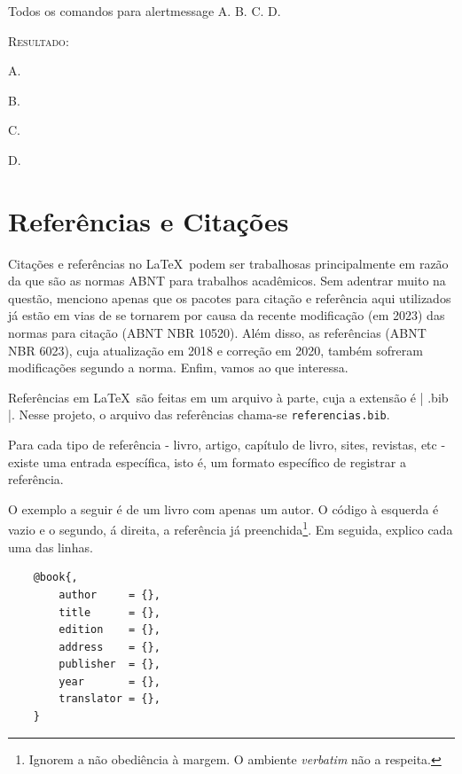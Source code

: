 \documentclass[a4paper,12pt,oneside,openright,extrafontsizes,openbib]{memoir}
\begin{document}
{\begin{codex}{Todos os comandos para alertmessage}
	A. 
	B. 
	C. 
	D. 
\end{codex}

\textsc{Resultado:}

A. 

B. 

C. 

D. 


\chapter{Referências e Citações}

Citações e referências no \LaTeX\ podem ser trabalhosas principalmente em razão da  que são as normas ABNT para trabalhos acadêmicos. Sem adentrar muito na questão, menciono apenas que os pacotes para citação e referência aqui utilizados já estão em vias de se tornarem  por causa da recente modificação (em 2023) das normas para citação (ABNT NBR 10520). Além disso, as referências (ABNT NBR 6023), cuja atualização em 2018 e correção em 2020, também sofreram modificações segundo a norma. Enfim, vamos ao que interessa.

Referências em \LaTeX\ são feitas em um arquivo à parte, cuja a extensão é | .bib |. Nesse projeto, o arquivo das referências chama-se \verb|referencias.bib|.

Para cada tipo de referência - livro, artigo, capítulo de livro, sites, revistas, etc - existe uma entrada específica, isto é, um formato específico de registrar a referência.

O exemplo a seguir é de um livro com apenas um autor. O código à esquerda é vazio e o segundo, á direita, a referência já preenchida\footnote{Ignorem a não obediência à margem. O ambiente \textit{verbatim} não a respeita.}. Em seguida, explico cada uma das linhas.

\begin{multicols}{2}
\begin{verbatim}
	@book{, 
		author     = {},
		title      = {},
		edition    = {},
		address    = {},
		publisher  = {},
		year       = {},
		translator = {},
	}
\end{verbatim}


\end{multicols}}
\end{document}
